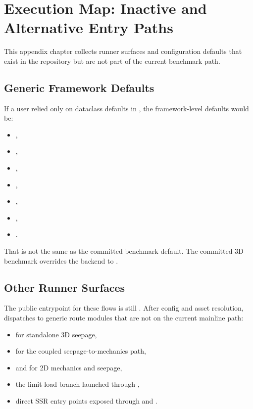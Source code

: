 \chapter{Execution Map: Inactive and Alternative Entry Paths}
\label{app:execution}

This appendix chapter collects runner surfaces and configuration defaults that
exist in the repository but are not part of the current
 benchmark path.

\section{Generic Framework Defaults}

If a user relied only on dataclass defaults in
, the framework-level defaults would be:
\begin{itemize}
\item {},
\item {},
\item {},
\item {},
\item {},
\item {},
\item {}.
\end{itemize}

That is not the same as the committed benchmark default. The committed 3D
benchmark overrides the backend to .

\section{Other Runner Surfaces}

The public entrypoint for these flows is still
. After config and asset resolution,
 dispatches to generic route modules
that are not on the current mainline path:
\begin{itemize}
\item {} for standalone 3D
seepage,
\item {} for the coupled
seepage-to-mechanics path,
\item {} and
 for 2D mechanics and seepage,
\item the limit-load branch launched through
,
\item direct SSR entry points exposed through
 and .
\end{itemize}

